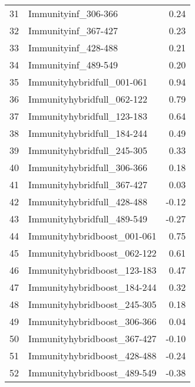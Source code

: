 \begin{table}[ht]
\begin{tabular}{rlr}
  31 & Immunityinf\_306-366 & 0.24 \\ 
  32 & Immunityinf\_367-427 & 0.23 \\ 
  33 & Immunityinf\_428-488 & 0.21 \\ 
  34 & Immunityinf\_489-549 & 0.20 \\ 
  35 & Immunityhybridfull\_001-061 & 0.94 \\ 
  36 & Immunityhybridfull\_062-122 & 0.79 \\ 
  37 & Immunityhybridfull\_123-183 & 0.64 \\ 
  38 & Immunityhybridfull\_184-244 & 0.49 \\ 
  39 & Immunityhybridfull\_245-305 & 0.33 \\ 
  40 & Immunityhybridfull\_306-366 & 0.18 \\ 
  41 & Immunityhybridfull\_367-427 & 0.03 \\ 
  42 & Immunityhybridfull\_428-488 & -0.12 \\ 
  43 & Immunityhybridfull\_489-549 & -0.27 \\ 
  44 & Immunityhybridboost\_001-061 & 0.75 \\ 
  45 & Immunityhybridboost\_062-122 & 0.61 \\ 
  46 & Immunityhybridboost\_123-183 & 0.47 \\ 
  47 & Immunityhybridboost\_184-244 & 0.32 \\ 
  48 & Immunityhybridboost\_245-305 & 0.18 \\ 
  49 & Immunityhybridboost\_306-366 & 0.04 \\ 
  50 & Immunityhybridboost\_367-427 & -0.10 \\ 
  51 & Immunityhybridboost\_428-488 & -0.24 \\ 
  52 & Immunityhybridboost\_489-549 & -0.38 \\ 
   \hline
\end{tabular}
\end{table}
